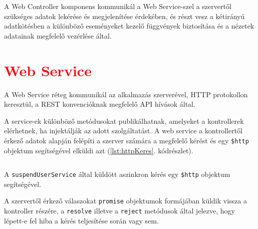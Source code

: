 A Web Controller komponens kommunikál a Web Service-szel a szervertől szükséges adatok lekérése és megjelenítése érdekében, és részt vesz a kétirányú adatkötésben a különböző eseményeket kezelő függvények biztosítása és a nézetek adatainak megfelelő vezérlése által. 

\section{\textcolor{red}{Web Service}}
\label{sec:webService}
A Web Service réteg kommunikál az alkalmazás szerverével, HTTP protokollon keresztül, a REST konvencióknak megfelelő API hívások által. 

A service-ek különböző metódusokat publikálhatnak, amelyeket a kontrollerek elérhetnek, ha injektálják az adott szolgáltatást. A web service a kontrollertől érkező adatok alapján felépíti a szerver számára a megfelelő kérést és egy \texttt{\$http} objektum segítségével elküldi azt (\ref{lst:httpKeres}. kódrészlet).

\begin{listing}
  \inputminted[fontsize=\small]{js}{progfiles/httpKeres.js}
  \caption{A \texttt{suspendUserService} által küldött aszinkron kérés egy \texttt{\$http} objektum segítségével.}
  \label{lst:httpKeres}
\end{listing}
A szervertől érkező válaszokat \texttt{promise} objektumok formájában küldik vissza a kontroller részére, a \texttt{resolve} illetve a \texttt{reject} metódusok által jelezve, hogy lépett-e fel hiba a kérés teljesítése során vagy sem. 

